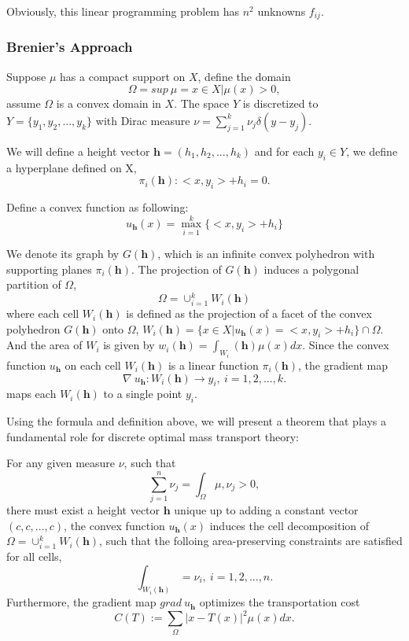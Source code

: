 \documentclass[runningheads]{llncs}
\begin{document}
Obviously, this linear programming problem has $n^2$ unknowns $f_{ij}$.

\subsubsection{Brenier's Approach}

Suppose $\mu$ has a compact support on $X$, define the domain $$\Omega = sup\ \mu={x\in X|\mu(x)>0},$$ assume $\Omega$ is a convex domain in $X$. The space $Y$ is discretized to $Y=\{y_1,y_2,...,y_k\}$ with Dirac measure $\nu =\sum^k_{j=1}\nu_j\delta(y-y_j).$

We will define a height vector $\mathbf{h}=(h_1,h_2,...,h_k)$ and for each $y_i\in Y$, we define a hyperplane defined on X, $$\pi_i(\mathbf{h}):<x,y_i>+h_i=0.$$

Define a convex function as following: $$u_\mathbf{h}(x)=\max^k_{i=1}\{<x,y_i>+h_i\}$$

We denote its graph by $G(\mathbf{h})$, which is an infinite convex polyhedron with supporting planes $\pi_i(\mathbf{h})$. The projection of $G(\mathbf{h})$ induces a polygonal partition of $\Omega$, $$\Omega = \cup^k_{i=1}W_i(\mathbf{h})$$ where each cell $W_i(\mathbf{h})$ is defined as the projection of a facet of the convex polyhedron $G(\mathbf{h})$ onto $\Omega$, $W_i(\mathbf{h})=\{x\in X|u_{\mathbf{h}}(x) = <x,y_i>+h_i\}\cap \Omega$. And the area of $W_i$ is given by $w_i(\mathbf{h})=\int_{W_i}(\mathbf{h})\mu(x)dx.$ Since the convex function $u_{\mathbf{h}}$ on each cell $W_i(\mathbf{h})$ is a linear function $\pi_i(\mathbf{h})$, the gradient map $$ \nabla\ u_\mathbf{h}:W_i(\mathbf{h})\rightarrow y_i, \ i=1,2,...,k.$$ maps each $W_i(\mathbf{h})$ to a single point $y_i$.

Using the formula and definition above, we will present a theorem that plays a fundamental role for discrete optimal mass transport theory:
\begin{theorem}
For any given measure $\nu$, such that $$\sum^n_{j=1}\nu_j=\int_\Omega \mu, \nu_j>0,$$ there must exist a height vector $\mathbf{h}$ unique up to adding a constant vector $(c,c,...,c)$, the convex function $u_\mathbf{h}(x)$ induces the cell decomposition of $\Omega = \cup^k_{i=1}W_i(\mathbf{h})$, such that the folloing area-preserving constraints are satisfied for all cells, $$\int_{W_i(\mathbf{h})}=\nu_i,\ i=1,2,...,n. $$
Furthermore, the gradient map $grad\ u_{\mathbf{h}}$ optimizes the transportation cost $$C(T):=\sum_\Omega|x-T(x)|^2\mu(x)dx.$$
\end{theorem}
\end{document}
